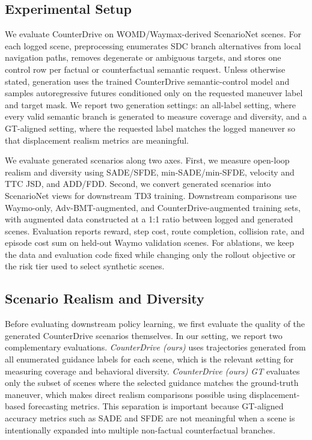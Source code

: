 \documentclass{article}
\begin{document}
\subsection{Experimental Setup}
\label{sec:experimental-setup}
We evaluate CounterDrive on WOMD/Waymax-derived ScenarioNet scenes. For each logged scene, preprocessing enumerates SDC branch alternatives from local navigation paths, removes degenerate or ambiguous targets, and stores one control row per factual or counterfactual semantic request. Unless otherwise stated, generation uses the trained CounterDrive semantic-control model and samples autoregressive futures conditioned only on the requested maneuver label and target mask. We report two generation settings: an all-label setting, where every valid semantic branch is generated to measure coverage and diversity, and a GT-aligned setting, where the requested label matches the logged maneuver so that displacement realism metrics are meaningful.

We evaluate generated scenarios along two axes. First, we measure open-loop realism and diversity using SADE/SFDE, min-SADE/min-SFDE, velocity and TTC JSD, and ADD/FDD. Second, we convert generated scenarios into ScenarioNet views for downstream TD3 training. Downstream comparisons use Waymo-only, Adv-BMT-augmented, and CounterDrive-augmented training sets, with augmented data constructed at a 1:1 ratio between logged and generated scenes. Evaluation reports reward, step cost, route completion, collision rate, and episode cost sum on held-out Waymo validation scenes. For ablations, we keep the data and evaluation code fixed while changing only the rollout objective or the risk tier used to select synthetic scenes.

\subsection{Scenario Realism and Diversity}
\label{sec:scenario-realism-diversity}
Before evaluating downstream policy learning, we first evaluate the quality of the generated CounterDrive scenarios themselves. In our setting, we report two complementary evaluations. \emph{CounterDrive (ours)} uses trajectories generated from all enumerated guidance labels for each scene, which is the relevant setting for measuring coverage and behavioral diversity. \emph{CounterDrive (ours) GT} evaluates only the subset of scenes where the selected guidance matches the ground-truth maneuver, which makes direct realism comparisons possible using displacement-based forecasting metrics. This separation is important because GT-aligned accuracy metrics such as SADE and SFDE are not meaningful when a scene is intentionally expanded into multiple non-factual counterfactual branches.
\end{document}
